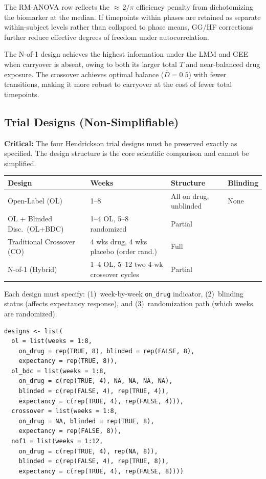 \documentclass[11pt]{article}
\begin{document}
The RM-ANOVA row reflects the ${\approx}\,2/\pi$ efficiency penalty from
dichotomizing the biomarker at the median. If timepoints within phases
are retained as separate within-subject levels rather than collapsed to
phase means, GG/HF corrections further reduce effective degrees of
freedom under autocorrelation.

The N-of-1 design achieves the highest information under the LMM and GEE
when carryover is absent, owing to both its larger total $T$ and
near-balanced drug exposure. The crossover achieves optimal balance
($\bar{D} = 0.5$) with fewer transitions, making it more robust to
carryover at the cost of fewer total timepoints.


\subsection{Trial Designs (Non-Simplifiable)}

\textbf{Critical:} The four Hendrickson trial designs must be preserved
exactly as specified. The design structure is the core scientific
comparison and cannot be simplified.

\begin{table}[h]
\centering\small
\begin{tabular}{@{}llll@{}}
\toprule
Design & Weeks & Structure & Blinding \\
\midrule
Open-Label (OL) & 1--8 & All on drug, unblinded & None \\
OL + Blinded Disc.\ (OL+BDC) & 1--4 OL, 5--8 randomized & Partial \\
Traditional Crossover (CO) & 4 wks drug, 4 wks placebo (order rand.) & Full \\
N-of-1 (Hybrid) & 1--4 OL, 5--12 two 4-wk crossover cycles & Partial \\
\bottomrule
\end{tabular}
\end{table}

Each design must specify: (1)~week-by-week \texttt{on\_drug} indicator,
(2)~blinding status (affects expectancy response), and
(3)~randomization path (which weeks are randomized).

\begin{Verbatim}[fontsize=\small]
designs <- list(
  ol = list(weeks = 1:8,
    on_drug = rep(TRUE, 8), blinded = rep(FALSE, 8),
    expectancy = rep(TRUE, 8)),
  ol_bdc = list(weeks = 1:8,
    on_drug = c(rep(TRUE, 4), NA, NA, NA, NA),
    blinded = c(rep(FALSE, 4), rep(TRUE, 4)),
    expectancy = c(rep(TRUE, 4), rep(FALSE, 4))),
  crossover = list(weeks = 1:8,
    on_drug = NA, blinded = rep(TRUE, 8),
    expectancy = rep(FALSE, 8)),
  nof1 = list(weeks = 1:12,
    on_drug = c(rep(TRUE, 4), rep(NA, 8)),
    blinded = c(rep(FALSE, 4), rep(TRUE, 8)),
    expectancy = c(rep(TRUE, 4), rep(FALSE, 8))))
\end{Verbatim}
\end{document}
